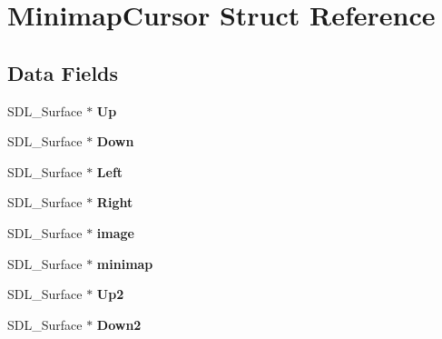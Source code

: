 \hypertarget{structMinimapCursor}{}\section{Minimap\+Cursor Struct Reference}
\label{structMinimapCursor}
\subsection*{Data Fields}
\begin{DoxyCompactItemize}
\item 
S\+D\+L\+\_\+\+Surface $\ast$ {\bfseries Up}\hypertarget{structMinimapCursor_a884386f2074953abc31b8c7470c6c628}{}\label{structMinimapCursor_a884386f2074953abc31b8c7470c6c628}

\item 
S\+D\+L\+\_\+\+Surface $\ast$ {\bfseries Down}\hypertarget{structMinimapCursor_a4acdf950ddea064b158a2bd321b23218}{}\label{structMinimapCursor_a4acdf950ddea064b158a2bd321b23218}

\item 
S\+D\+L\+\_\+\+Surface $\ast$ {\bfseries Left}\hypertarget{structMinimapCursor_a820a4b826495f398993f65e2795721d5}{}\label{structMinimapCursor_a820a4b826495f398993f65e2795721d5}

\item 
S\+D\+L\+\_\+\+Surface $\ast$ {\bfseries Right}\hypertarget{structMinimapCursor_afa76aac870fdd7c0eb46ddaeac020d47}{}\label{structMinimapCursor_afa76aac870fdd7c0eb46ddaeac020d47}

\item 
S\+D\+L\+\_\+\+Surface $\ast$ {\bfseries image}\hypertarget{structMinimapCursor_a6ecebcbf6574683e5e34829b39ef912d}{}\label{structMinimapCursor_a6ecebcbf6574683e5e34829b39ef912d}

\item 
S\+D\+L\+\_\+\+Surface $\ast$ {\bfseries minimap}\hypertarget{structMinimapCursor_a8b5c4625391d3795d5b9e3228cd75565}{}\label{structMinimapCursor_a8b5c4625391d3795d5b9e3228cd75565}

\item 
S\+D\+L\+\_\+\+Surface $\ast$ {\bfseries Up2}\hypertarget{structMinimapCursor_a09296fbaafa93d9334e6b32417938168}{}\label{structMinimapCursor_a09296fbaafa93d9334e6b32417938168}

\item 
S\+D\+L\+\_\+\+Surface $\ast$ {\bfseries Down2}\hypertarget{structMinimapCursor_a53a3f6b3c5322931abd8ef8a450455f7}{}\label{structMinimapCursor_a53a3f6b3c5322931abd8ef8a450455f7}


\end{DoxyCompactItemize}
